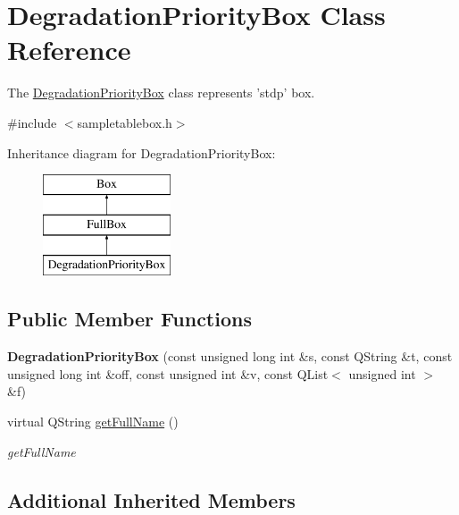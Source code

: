 \hypertarget{class_degradation_priority_box}{\section{Degradation\-Priority\-Box Class Reference}
\label{class_degradation_priority_box}
}


The \hyperlink{class_degradation_priority_box}{Degradation\-Priority\-Box} class represents 'stdp' box.  




{\ttfamily \#include $<$sampletablebox.\-h$>$}

Inheritance diagram for Degradation\-Priority\-Box\-:\begin{figure}[H]
\begin{center}
\leavevmode
\includegraphics[height=3.000000cm]{class_degradation_priority_box}
\end{center}
\end{figure}
\subsection*{Public Member Functions}
\begin{DoxyCompactItemize}
\item 
\hypertarget{class_degradation_priority_box_aada43a711372fafb33a926c87d664fd8}{{\bfseries Degradation\-Priority\-Box} (const unsigned long int \&s, const Q\-String \&t, const unsigned long int \&off, const unsigned int \&v, const Q\-List$<$ unsigned int $>$ \&f)}\label{class_degradation_priority_box_aada43a711372fafb33a926c87d664fd8}

\item 
virtual Q\-String \hyperlink{class_degradation_priority_box_a97f91434e74e47bc9e10ff9a21dd3023}{get\-Full\-Name} ()
\begin{DoxyCompactList}\small\item\em get\-Full\-Name \end{DoxyCompactList}\end{DoxyCompactItemize}
\subsection*{Additional Inherited Members}



